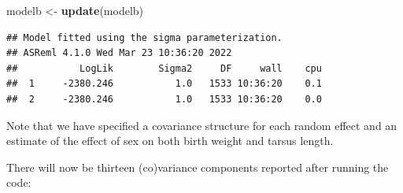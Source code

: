 \documentclass[
  12pt,
]{book}
\newenvironment{Shaded}{\begin{snugshade}}{\end{snugshade}}
\newcommand{\KeywordTok}[1]{\textcolor[rgb]{0.13,0.29,0.53}{\textbf{#1}}}
\newcommand{\NormalTok}[1]{#1}
\newcommand{\OperatorTok}[1]{\textcolor[rgb]{0.81,0.36,0.00}{\textbf{#1}}}
\newcommand{\StringTok}[1]{\textcolor[rgb]{0.31,0.60,0.02}{#1}}
\begin{document}
\begin{Shaded}
\begin{Highlighting}[]
\NormalTok{modelb \textless{}{-}}\StringTok{ }\KeywordTok{update}\NormalTok{(modelb)}
\end{Highlighting}
\end{Shaded}

\begin{verbatim}
## Model fitted using the sigma parameterization.
## ASReml 4.1.0 Wed Mar 23 10:36:20 2022
##           LogLik        Sigma2     DF     wall    cpu
##  1     -2380.246           1.0   1533 10:36:20    0.1
##  2     -2380.246           1.0   1533 10:36:20    0.0
\end{verbatim}

Note that we have specified a covariance structure for each random effect and an estimate of the effect of sex on both birth weight and tarsus length.

There will now be thirteen (co)variance components reported after running the code:

\begin{Shaded}
\end{Shaded}
\end{document}
